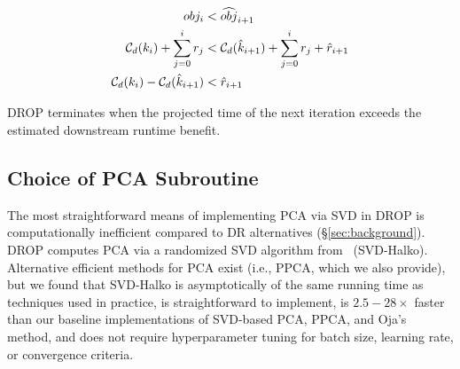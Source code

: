 \vspace{-.4cm}
\begin{align}
  obj_i &< \widehat{obj}_{i+1} \nonumber \\
  \mathcal{C}_{\color{black}d}(k_i) + \sum_{j=0}^i r_j &< \mathcal{C}_{\color{black}d}(\hat{k}_{i+1}) + \sum_{j=0}^{i} r_j + \hat{r}_{i+1} \nonumber \\
  \mathcal{C}_{\color{black}d}(k_i) - \mathcal{C}_{\color{black}d}(\hat{k}_{i+1}) &< \hat{r}_{i+1}  \label{eq:check}
\end{align}

DROP terminates when the projected time of the next iteration exceeds the estimated downstream runtime benefit. 

\subsection{Choice of PCA Subroutine}
\label{subsec:pcaroutine}

The most straightforward means of implementing PCA via SVD in DROP is computationally inefficient compared to DR alternatives (\S\ref{sec:background}).  
DROP computes PCA via a randomized SVD algorithm from~\cite{tropp} (SVD-Halko).
Alternative efficient methods for PCA exist (i.e., PPCA, which we also provide), but we found that SVD-Halko is asymptotically of the same running time as techniques used in practice, is straightforward to implement, is $2.5-28\times$ faster than our baseline implementations of SVD-based PCA, PPCA, and Oja's method, and does not require hyperparameter tuning for batch size, learning rate, or convergence criteria.  

